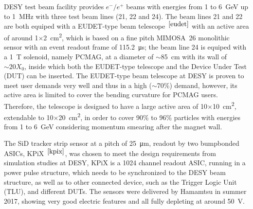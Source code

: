 DESY test beam facility provides $e^-/e^+$ beams with energies from 1 to \SI{6}{\GeV} up to \SI{1}{\MHz}
with three test beam lines (21, 22 and 24).
The beam lines 21 and 22 are both equiped with a EUDET-type beam telescope~$^{\cite{eudet}}$ with an active area of around 1$\times$\SI{2}{\square\centi\metre},
which is based on a fine pitch \uppercase{mimosa}~26 monolithic sensor with an event readout frame of \SI{115.2}{\micro\second};
the beam line 24 is equiped with a \SI{1}{\tesla} solenoid, namely PCMAG, at a diameter of $\sim$\SI{85}{\centi\metre} with its wall of $\sim20X_0$,
inside which both the EUDET-type telescope and the Device Under Test (DUT) can be inserted.
The EUDET-type beam telescope at DESY is proven to meet user demands very well and thus in a high ($\sim$70\%) demand,
however, its active area is limited to cover the bending curvature for PCMAG users.
Therefore, the \lycoris telescope is designed to have a large active area of 10$\times$\SI{10}{\square\centi\metre}, extendable to 10$\times$\SI{20}{\square\centi\metre},
in order to cover 90\% to 96\% particles with energies from 1 to \SI{6}{\GeV} considering momentum smearing after the magnet wall.

The SiD tracker strip sensor at a pitch of \SI{25}{\micro\metre}, readout by two bumpbonded ASICs, KPiX~$^{\cite{kpix}}$, was chosen to meet the design requirements from simulation studies at DESY,
KPiX is a 1024 channel readout ASIC, running in a power pulse structure, which needs to be synchronized to the DESY beam structure, as well as to other connected device, such as the Trigger Logic Unit (TLU), and different DUTs.
The sensors were delivered by Hamamtsu in summer 2017, showing very good electric features and all fully depleting at around \SI{50}{\volt}.


